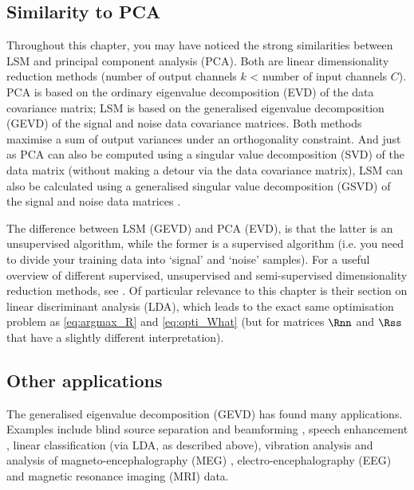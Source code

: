 \subsection{Similarity to PCA}

Throughout this chapter, you may have noticed the strong similarities between
LSM and principal component analysis (PCA). Both are linear dimensionality
reduction methods (number of output channels $k$ < number of input channels
$C$). PCA is based on the ordinary eigenvalue decomposition (EVD) of the data
covariance matrix; LSM is based on the generalised eigenvalue decomposition
(GEVD) of the signal and noise data covariance matrices. Both methods
maximise a sum of output variances under an orthogonality constraint. And
just as PCA can also be computed using a singular value decomposition (SVD)
of the data matrix (without making a detour via the data covariance matrix),
LSM can also be calculated using a generalised singular value decomposition
(GSVD) of the signal and noise data matrices \cite{Howland2004}.

The difference between LSM (GEVD) and PCA (EVD), is that the latter is an
unsupervised algorithm, while the former is a supervised algorithm (i.e. you
need to divide your training data into `signal' and `noise' samples). For a
useful overview of different supervised, unsupervised and semi-supervised
dimensionality reduction methods, see \cite{Kokiopoulou2011}.\footnotemark{}
Of particular relevance to this chapter is their section on linear
discriminant analysis (LDA), which leads to the exact same optimisation
problem as \cref{eq:argmax_R} and \cref{eq:opti_What} (but for matrices
$\Rnn$ and $\Rss$ that have a slightly different interpretation).




\subsection{Other applications}

The generalised eigenvalue decomposition (GEVD) has found many applications.
Examples include blind source separation and beamforming
\cite{Tome2006,Warsitz2007}, speech enhancement \cite{Doclo2002}, linear
classification (via LDA, as described above), vibration analysis
\cite{Zhou2007} and analysis of magneto-encephalography (MEG)
\cite{Sekihara1999}, electro-encephalography (EEG) \cite{Blankertz2008} and
magnetic resonance imaging (MRI) \cite{Zhang2015} data.



